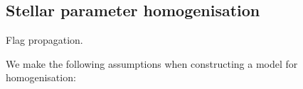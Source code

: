\documentclass[preprint]{aastex}
\begin{document}









\subsection{Stellar parameter homogenisation}
\label{sec:stellar-parameter-homogenisation}


Flag propagation.

\noindent{}We make the following assumptions when constructing a model for homogenisation:
\end{document}
